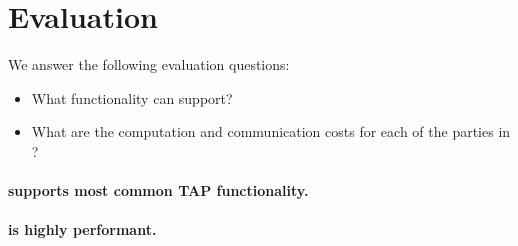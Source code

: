 \section{Evaluation}
\label{sec:evaluation}

We answer the following evaluation questions:
\begin{itemize}
  \item What functionality can \sys support?
  \item What are the computation and communication costs for each of the parties
    in \sys?
\end{itemize}

\paragraph{\sys supports most common TAP functionality.}

\paragraph{\sys is highly performant.}

%
%
